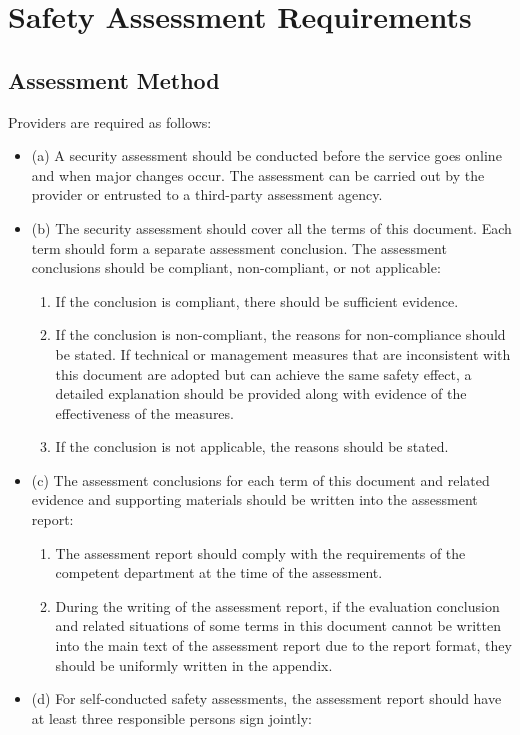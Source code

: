 \documentclass{article}
\begin{document}
\section{Safety Assessment Requirements}
\subsection{Assessment Method}
Providers are required as follows:
\begin{itemize}
    \item (a) A security assessment should be conducted before the service goes online and when major changes occur. The assessment can be carried out by the provider or entrusted to a third-party assessment agency.
    \item (b) The security assessment should cover all the terms of this document. Each term should form a separate assessment conclusion. The assessment conclusions should be compliant, non-compliant, or not applicable:
    \begin{enumerate}
        \item If the conclusion is compliant, there should be sufficient evidence.
        \item If the conclusion is non-compliant, the reasons for non-compliance should be stated. If technical or management measures that are inconsistent with this document are adopted but can achieve the same safety effect, a detailed explanation should be provided along with evidence of the effectiveness of the measures.
        \item If the conclusion is not applicable, the reasons should be stated.
    \end{enumerate}
    \item (c) The assessment conclusions for each term of this document and related evidence and supporting materials should be written into the assessment report:
    \begin{enumerate}
        \item The assessment report should comply with the requirements of the competent department at the time of the assessment.
        \item During the writing of the assessment report, if the evaluation conclusion and related situations of some terms in this document cannot be written into the main text of the assessment report due to the report format, they should be uniformly written in the appendix.
    \end{enumerate}
    \item (d) For self-conducted safety assessments, the assessment report should have at least three responsible persons sign jointly:

\end{itemize}
\end{document}
